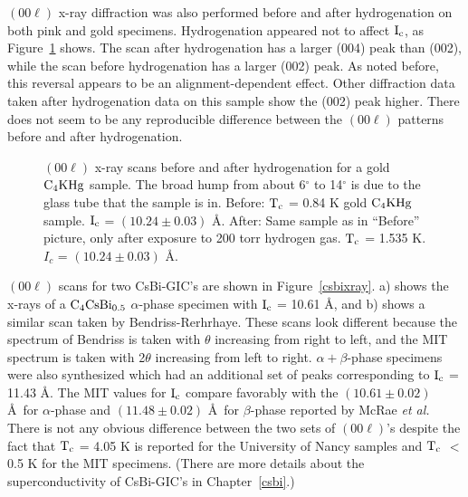         $(00\ell)$  x-ray diffraction was also  performed before and  after
hydrogenation on both pink and gold specimens.  Hydrogenation  appeared not
to affect $\rm    I_c$, as  Figure~\ref{hydxrd}   shows.   The scan   after
hydrogenation  has a larger (004)  peak than (002),  while the scan  before
hydrogenation has  a  larger (002) peak.  As  noted  before, this  reversal
appears to be an alignment-dependent  effect.  Other diffraction data taken
after hydrogenation data on this sample show the (002) peak higher.   There
does not seem to be any reproducible difference between the $(00\ell)$
patterns before and after hydrogenation.

\begin{figure}
\vspace{20cm}
\caption[$(00\ell)$ x-ray scans be\-fore and after hyd\-rog\-en\-ation for a gold
$\rm C_4KHg$ sample.]{$(00\ell)$ x-ray scans be\-fore and after hyd\-rog\-en\-ation for a gold
$\rm C_4KHg$ sample.  The  broad  hump from about 6$^{\circ}$ to
14$^{\circ}$ is due to the glass tube that the sample  is in.  Before: $\rm
T_c$ = 0.84  K gold $\rm C_4KHg$ sample.   $\rm  I_c$  = $(10.24 \pm 0.03)$
\AA.  After:  Same sample as in ``Before''  picture, only after exposure to
200 torr hydrogen  gas.  $\rm T_c$  = 1.535 K.   $I_c$ = $(10.24 \pm  0.03)$
\AA.}
\label{hydxrd}
\end{figure}

        $(00\ell)$   scans     for  two      CsBi-GIC's   are    shown   in
Figure~\ref{csbixray}.   a)  shows  the x-rays   of a   $\rm C_4CsBi_{0.5}$
$\alpha$-phase specimen with $\rm I_c$ = 10.61 \AA, and  b) shows a similar
scan taken  by  Bendriss-Rerhrhaye.\cite{bendriss86} These scans  look different
because   the spectrum of  Bendriss   is taken   with $\theta$
increasing from right to left, and the MIT spectrum is taken with 2$\theta$
increasing from left to right.   $\alpha + \beta$-phase specimens were also
synthesized which had an additional set of peaks corresponding to $\rm I_c$
=  11.43 \AA.  The MIT values  for $\rm I_c$  compare favorably   with the
$(10.61 \pm 0.02)$ \AA\ for $\alpha$-phase and $(11.48 \pm  0.02)$ \AA\ for
$\beta$-phase reported by  McRae {\em et  al.\/}\cite{mcrae86} There is not
any obvious difference  between the  two sets of $(00\ell)$'s  despite  the
fact that  $\rm T_c$  =  4.05 K  is reported for  the University  of  Nancy
samples and  $\rm T_c$  $<$ 0.5  K for the  MIT  specimens.   (There are more
details about the superconductivity of CsBi-GIC's in Chapter~\ref{csbi}.)

